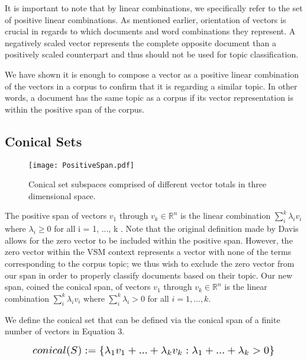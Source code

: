 \documentclass[11pt]{article}
\begin{document}
It is important to note that by linear combinations, we specifically refer to the set of positive linear combinations. As mentioned earlier, orientation of vectors is crucial in regards to which documents and word combinations they represent. A negatively scaled vector represents the complete opposite document than a positively scaled counterpart and thus should not be used for topic classification.

We have shown it is enough to compose a vector as a positive linear combination of the vectors in a corpus to confirm that it is regarding a similar topic. In other words, a document has the same topic as a corpus if its vector representation is within the positive span of the corpus.

\subsection{Conical Sets}

\begin{figure*}[htbb]
    \centering
    \def\svgwidth{\textwidth}
    \centerline{\texttt{[image: PositiveSpan.pdf]}}
    \caption{Conical set subspaces comprised of different vector totals in three dimensional space.}
    \label{fig:some_label}
\end{figure*}

The positive span of vectors $v_1$ through $v_k \in \mathbb{R}^n$ is the linear combination $\sum_i^k\lambda_iv_i$ where $\lambda_i \geq 0$ for all i = 1, ..., k \cite{davis1954theory}. Note that the original definition made by Davis allows for the zero vector to be included within the positive span. However, the zero vector within the VSM context represents a vector with none of the terms corresponding to the corpus topic; we thus wish to exclude the zero vector from our span in order to properly classify documents based on their topic. Our new span, coined the conical span, of vectors $v_1$ through $v_k \in \mathbb{R}^n$ is the linear combination $\sum_i^k\lambda_iv_i$ where $\sum_i^k \lambda_i > 0$ for all $i = 1, ..., k$.

We define the conical set that can be defined via the conical span of a finite number of vectors in Equation 3.

\vspace{-4mm}
\begin{equation}
    \resizebox{0.85\linewidth}{!}
    {$
        conical(S) := \left\{\lambda_1v_1 + ... + \lambda_kv_k : \lambda_1 + ... + \lambda_k > 0 \right\}
    $}
\end{equation}
\end{document}
